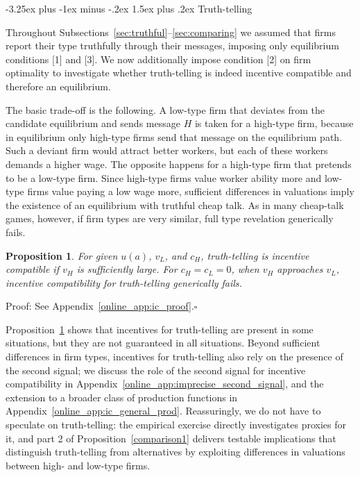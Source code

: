 \documentclass[12pt]{article}
\makeatletter
\renewcommand{\subsection}{%
  \@startsection{subsection}{2}{\z@}%
  {-3.25ex plus -1ex minus -.2ex}%
  {1.5ex plus .2ex}%
  {\normalfont\large\bfseries}%
}
\newtheorem{prop}{Proposition}
\makeatother
\begin{document}
\subsection{Truth-telling}\label{sec:truth-telling}

Throughout Subsections~\ref{sec:truthful}--\ref{sec:comparing} we assumed that firms report their type truthfully through their messages, imposing only equilibrium conditions [1] and [3]. We now additionally impose condition [2] on firm optimality to investigate whether truth-telling is indeed incentive compatible and therefore an equilibrium.

The basic trade-off is the following. A low-type firm that deviates from the candidate equilibrium and sends message $H$ is taken for a high-type firm, because in equilibrium only high-type firms send that message on the equilibrium path. Such a deviant firm would attract better workers, but each of these workers demands a higher wage. The opposite happens for a high-type firm that pretends to be a low-type firm. Since high-type firms value worker ability more and low-type firms value paying a low wage more, sufficient differences in valuations imply the existence of an equilibrium with truthful cheap talk. As in many cheap-talk games, however, if firm types are very similar, full type revelation generically fails.

\begin{prop}
\label{prop:incentive_compat} For given $u(a)$, $v_{L}$, and $c_{H}$, truth-telling is incentive compatible if $v_{H}$ is sufficiently large. For $c_{H}=c_{L}=0$, when $v_{H}$ approaches $v_{L}$, incentive compatibility for truth-telling generically fails.
\end{prop}

\noindent Proof: See Appendix~\ref{online_app:ic_proof}.$\square$\bigskip

Proposition~\ref{prop:incentive_compat} shows that incentives for truth-telling are present in some situations, but they are not guaranteed in all situations. Beyond sufficient differences in firm types, incentives for truth-telling also rely on the presence of the second signal; we discuss the role of the second signal for incentive compatibility in Appendix~\ref{online_app:imprecise_second_signal}, and the extension to a broader class of production functions in Appendix~\ref{online_app:ic_general_prod}. Reassuringly, we do not have to speculate on truth-telling: the empirical exercise directly investigates proxies for it, and part 2 of Proposition~\ref{comparison1} delivers testable implications that distinguish truth-telling from alternatives by exploiting differences in valuations between high- and low-type firms.
\end{document}
